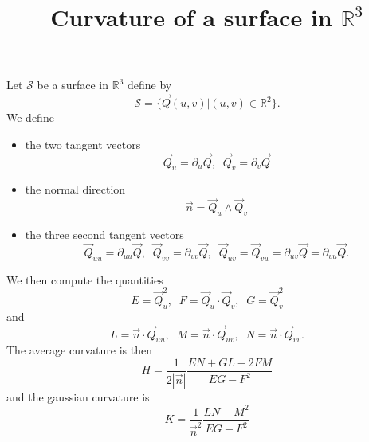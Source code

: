 \documentclass[aps,onecolumn]{revtex4}
\begin{document}
\title{Curvature of a surface in $\mathbb{R}^3$}
\maketitle

Let $\mathcal{S}$ be a surface in $\mathbb{R}^3$ define by
\begin{equation}
	\mathcal{S} = \lbrace \vec{Q}(u,v) \vert  (u,v) \in \mathbb{R}^2 \rbrace.
\end{equation}
We define 
\begin{itemize}
\item the two tangent vectors
\begin{equation}
	\vec{Q}_u = \partial_u \vec{Q},\;\;\vec{Q}_v = \partial_v \vec{Q}
\end{equation}

\item the normal direction
	\begin{equation}
		\vec{n} = \vec{Q}_u \wedge \vec{Q}_v
	\end{equation}	

\item the three second tangent vectors
\begin{equation}
	\vec{Q}_{uu} = \partial_{uu} \vec{Q},\;\;\vec{Q}_{vv}=\partial_{vv} \vec{Q},\;\;
	\vec{Q}_{uv} = \vec{Q}_{vu} = \partial_{uv} \vec{Q} = \partial_{vu} \vec{Q}.
\end{equation}

\end{itemize}

We then compute the quantities
\begin{equation}
	E = \vec{Q}_u^2, \;\; F = \vec{Q}_u \cdot \vec{Q}_v,\;\; G = \vec{Q}_v^2
\end{equation}
and
\begin{equation}
	L = \vec{n} \cdot \vec{Q}_{uu},\;\; M =\vec{n} \cdot \vec{Q}_{uv}, \;\; N = \vec{n}\cdot\vec{Q}_{vv}.
\end{equation}
The average curvature is then
\begin{equation}
	H = \dfrac{1}{2\left\vert\vec{n}\right\vert} \dfrac{EN+GL-2FM}{EG-F^2}
\end{equation}
and the gaussian curvature is
\begin{equation}
	K = \dfrac{1}{\vec{n}^2}\dfrac{LN-M^2}{EG-F^2}
\end{equation}
\end{document}
